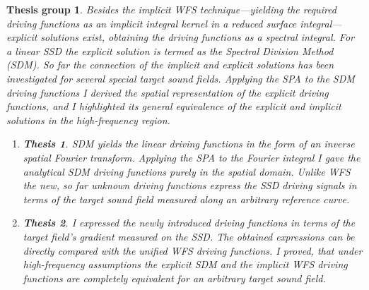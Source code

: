 \documentclass[10pt,twoside]{article}
\theoremstyle{thesisgroupstyle}
\newtheorem{thesisgroup}{Thesis group}
\newtheorem{thesis}{Thesis}[thesisgroup]
\begin{document}
\begin{thesisgroup}
Besides the implicit WFS technique---yielding the required driving functions as an implicit integral kernel in a reduced surface integral---explicit solutions exist, obtaining the driving functions as a spectral integral.
For a linear SSD the explicit solution is termed as the \emph{Spectral Division Method (SDM)}.
So far the connection of the implicit and explicit solutions has been investigated for several special target sound fields.
Applying the SPA to the SDM driving functions I derived the spatial representation of the explicit driving functions, and I highlighted its general equivalence of the explicit and implicit solutions in the high-frequency region.
\begin{enumerate}
\item[] \vspace{-7mm}\begin{thesis}SDM yields the linear driving functions in the form of an inverse spatial Fourier transform.
Applying the SPA to the Fourier integral I gave the analytical SDM driving functions purely in the spatial domain.
Unlike WFS the new, so far unknown driving functions express the SSD driving signals in terms of the target sound field measured along an arbitrary reference curve.\end{thesis}
\item[] \vspace{-7mm}\begin{thesis}I expressed the newly introduced driving functions in terms of the target field's gradient measured on the SSD.
The obtained expressions can be directly compared with the unified WFS driving functions.
I proved, that under high-frequency assumptions the explicit SDM and the implicit WFS driving functions are completely equivalent for an arbitrary target sound field.\end{thesis}
\end{enumerate}
\end{thesisgroup}
\end{document}
